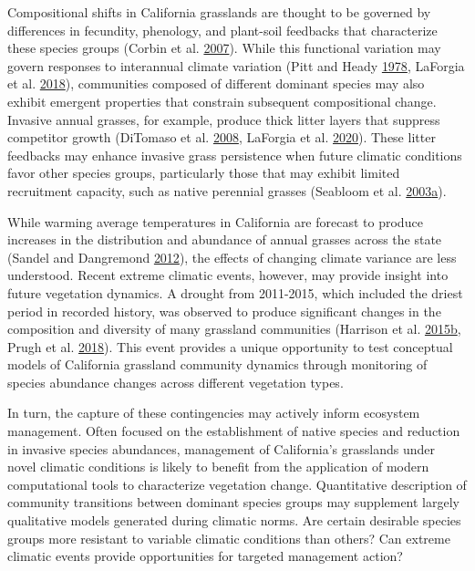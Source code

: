 \documentclass[twoside,12pt,final]{ucthesis-CA2012}
\begin{document}
\begin{ucmainmatter}
Compositional shifts in California grasslands are thought to be governed by differences in fecundity, phenology, and plant-soil feedbacks that characterize these species groups (Corbin et al. \protect\hyperlink{ref-Corbin2007}{2007}).
While this functional variation may govern responses to interannual climate variation (Pitt and Heady \protect\hyperlink{ref-Pitt1978}{1978}, LaForgia et al. \protect\hyperlink{ref-Laforgia2018}{2018}), communities composed of different dominant species may also exhibit emergent properties that constrain subsequent compositional change.
Invasive annual grasses, for example, produce thick litter layers that suppress competitor growth (DiTomaso et al. \protect\hyperlink{ref-DiTomaso2008}{2008}, LaForgia et al. \protect\hyperlink{ref-Laforgia2020}{2020}).
These litter feedbacks may enhance invasive grass persistence when future climatic conditions favor other species groups, particularly those that may exhibit limited recruitment capacity, such as native perennial grasses (Seabloom et al. \protect\hyperlink{ref-Seabloom2003}{2003}\protect\hyperlink{ref-Seabloom2003}{a}).

While warming average temperatures in California are forecast to produce increases in the distribution and abundance of annual grasses across the state (Sandel and Dangremond \protect\hyperlink{ref-Sandel2012}{2012}), the effects of changing climate variance are less understood.
Recent extreme climatic events, however, may provide insight into future vegetation dynamics.
A drought from 2011-2015, which included the driest period in recorded history, was observed to produce significant changes in the composition and diversity of many grassland communities (Harrison et al. \protect\hyperlink{ref-Harrison2015}{2015}\protect\hyperlink{ref-Harrison2015}{b}, Prugh et al. \protect\hyperlink{ref-Prugh2018}{2018}).
This event provides a unique opportunity to test conceptual models of California grassland community dynamics through monitoring of species abundance changes across different vegetation types.

In turn, the capture of these contingencies may actively inform ecosystem management.
Often focused on the establishment of native species and reduction in invasive species abundances, management of California's grasslands under novel climatic conditions is likely to benefit from the application of modern computational tools to characterize vegetation change.
Quantitative description of community transitions between dominant species groups may supplement largely qualitative models generated during climatic norms. Are certain desirable species groups more resistant to variable climatic conditions than others? Can extreme climatic events provide opportunities for targeted management action?


\end{ucmainmatter}
\end{document}
